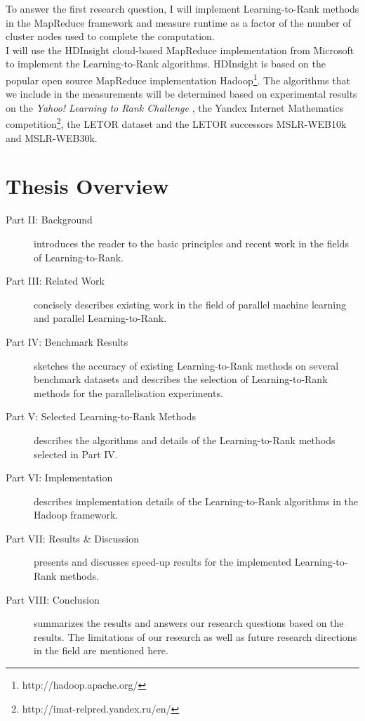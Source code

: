 To answer the first research question, I will implement Learning-to-Rank methods in the MapReduce framework and measure runtime as a factor of the number of cluster nodes used to complete the computation.\\

I will use the HDInsight cloud-based MapReduce implementation from Microsoft to implement the Learning-to-Rank algorithms. HDInsight is based on the popular open source MapReduce implementation Hadoop\footnote{http://hadoop.apache.org/}.
The algorithms that we include in the measurements will be determined based on experimental results on the \emph{Yahoo! Learning to Rank Challenge} \cite{Chapelle2011a}, the Yandex Internet Mathematics competition\footnote{http://imat-relpred.yandex.ru/en/}, the LETOR \cite{Qin2010} dataset and the LETOR successors MSLR-WEB10k and MSLR-WEB30k.

\chapter{Thesis Overview}

\begin{description}
\item[Part II: Background]{introduces the reader to the basic principles and recent work in the fields of Learning-to-Rank.}
\item[Part III: Related Work]{concisely describes existing work in the field of parallel machine learning and parallel Learning-to-Rank.}
\item[Part IV: Benchmark Results]{sketches the accuracy of existing Learning-to-Rank methods on several benchmark datasets and describes the selection of Learning-to-Rank methods for the parallelisation experiments.}
\item[Part V: Selected Learning-to-Rank Methods]{describes the algorithms and details of the Learning-to-Rank methods selected in Part IV.}
\item[Part VI: Implementation]{describes implementation details of the Learning-to-Rank algorithms in the Hadoop framework.}
\item[Part VII: Results \& Discussion]{presents and discusses speed-up results for the implemented Learning-to-Rank methods.}
\item[Part VIII: Conclusion]{summarizes the results and answers our research questions based on the results. The limitations of our research as well as future research directions in the field are mentioned here.}
\end{description}